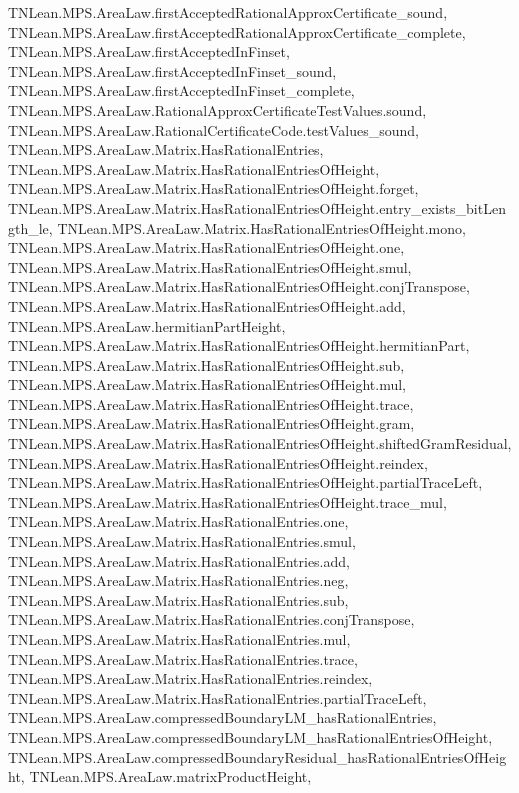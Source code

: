 \begin{lemma}
{        TNLean.MPS.AreaLaw.firstAcceptedRationalApproxCertificate_sound,
        TNLean.MPS.AreaLaw.firstAcceptedRationalApproxCertificate_complete,
        TNLean.MPS.AreaLaw.firstAcceptedInFinset,
        TNLean.MPS.AreaLaw.firstAcceptedInFinset_sound,
        TNLean.MPS.AreaLaw.firstAcceptedInFinset_complete,
        TNLean.MPS.AreaLaw.RationalApproxCertificateTestValues.sound,
        TNLean.MPS.AreaLaw.RationalCertificateCode.testValues_sound,
        TNLean.MPS.AreaLaw.Matrix.HasRationalEntries,
        TNLean.MPS.AreaLaw.Matrix.HasRationalEntriesOfHeight,
        TNLean.MPS.AreaLaw.Matrix.HasRationalEntriesOfHeight.forget,
        TNLean.MPS.AreaLaw.Matrix.HasRationalEntriesOfHeight.entry_exists_bitLength_le,
        TNLean.MPS.AreaLaw.Matrix.HasRationalEntriesOfHeight.mono,
        TNLean.MPS.AreaLaw.Matrix.HasRationalEntriesOfHeight.one,
        TNLean.MPS.AreaLaw.Matrix.HasRationalEntriesOfHeight.smul,
        TNLean.MPS.AreaLaw.Matrix.HasRationalEntriesOfHeight.conjTranspose,
        TNLean.MPS.AreaLaw.Matrix.HasRationalEntriesOfHeight.add,
        TNLean.MPS.AreaLaw.hermitianPartHeight,
        TNLean.MPS.AreaLaw.Matrix.HasRationalEntriesOfHeight.hermitianPart,
        TNLean.MPS.AreaLaw.Matrix.HasRationalEntriesOfHeight.sub,
        TNLean.MPS.AreaLaw.Matrix.HasRationalEntriesOfHeight.mul,
        TNLean.MPS.AreaLaw.Matrix.HasRationalEntriesOfHeight.trace,
        TNLean.MPS.AreaLaw.Matrix.HasRationalEntriesOfHeight.gram,
        TNLean.MPS.AreaLaw.Matrix.HasRationalEntriesOfHeight.shiftedGramResidual,
        TNLean.MPS.AreaLaw.Matrix.HasRationalEntriesOfHeight.reindex,
        TNLean.MPS.AreaLaw.Matrix.HasRationalEntriesOfHeight.partialTraceLeft,
        TNLean.MPS.AreaLaw.Matrix.HasRationalEntriesOfHeight.trace_mul,
        TNLean.MPS.AreaLaw.Matrix.HasRationalEntries.one,
        TNLean.MPS.AreaLaw.Matrix.HasRationalEntries.smul,
        TNLean.MPS.AreaLaw.Matrix.HasRationalEntries.add,
        TNLean.MPS.AreaLaw.Matrix.HasRationalEntries.neg,
        TNLean.MPS.AreaLaw.Matrix.HasRationalEntries.sub,
        TNLean.MPS.AreaLaw.Matrix.HasRationalEntries.conjTranspose,
        TNLean.MPS.AreaLaw.Matrix.HasRationalEntries.mul,
        TNLean.MPS.AreaLaw.Matrix.HasRationalEntries.trace,
        TNLean.MPS.AreaLaw.Matrix.HasRationalEntries.reindex,
        TNLean.MPS.AreaLaw.Matrix.HasRationalEntries.partialTraceLeft,
        TNLean.MPS.AreaLaw.compressedBoundaryLM_hasRationalEntries,
        TNLean.MPS.AreaLaw.compressedBoundaryLM_hasRationalEntriesOfHeight,
        TNLean.MPS.AreaLaw.compressedBoundaryResidual_hasRationalEntriesOfHeight,
        TNLean.MPS.AreaLaw.matrixProductHeight,
}
\end{lemma}
